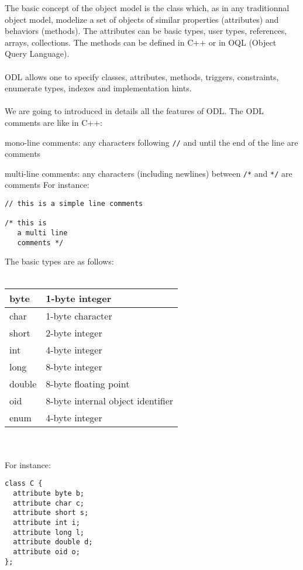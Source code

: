 
The basic concept of the \eyedb object model is the class which, as in any
traditionnal object model, modelize a set
of objects of similar properties (attributes) and behaviors (methods).
The attributes can be basic types, user types, references, arrays, collections.
The methods can be defined in C++ or in OQL (Object Query Language).
\\
\\
ODL allows one to specify classes, attributes, methods, triggers, constraints,
enumerate types, indexes and implementation hints.
\\
\\
We are going to introduced in details all the features of ODL.
The ODL comments are like in C++:
\bi
\item mono-line comments: any characters following \texttt{//} and until
the end of the line are comments
\item multi-line comments: any characters (including newlines) between \texttt{/*} and \texttt{*/}
are comments
\ei
For instance:
\vspace{-2mm}
\begin{verbatim}
// this is a simple line comments

/* this is
   a multi line
   comments */
\end{verbatim}
The basic types are as follows:\\\\
\begin{tabular}{|p{2cm}|p{5cm}|}
\hline
byte & 1-byte integer \\
\hline
char & 1-byte character \\
\hline
short & 2-byte integer \\
\hline
int & 4-byte integer \\
\hline
long & 8-byte integer \\
\hline
double & 8-byte floating point \\
\hline
oid & 8-byte internal object identifier \\
\hline
enum & 4-byte integer \\
\hline
\end{tabular}
\\
\\
For instance:
\vspace{-0.2cm}
\begin{verbatim}
class C {
  attribute byte b;
  attribute char c;
  attribute short s;
  attribute int i;
  attribute long l;
  attribute double d;
  attribute oid o;
};
\end{verbatim}
